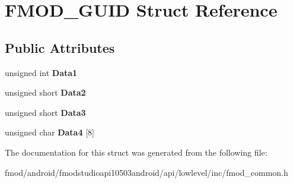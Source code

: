 \hypertarget{struct_f_m_o_d___g_u_i_d}{\section{F\+M\+O\+D\+\_\+\+G\+U\+I\+D Struct Reference}
\label{struct_f_m_o_d___g_u_i_d}
}
\subsection*{Public Attributes}
\begin{DoxyCompactItemize}
\item 
\hypertarget{struct_f_m_o_d___g_u_i_d_ade5cc5a3c9665147a488c8a9e2ea211c}{unsigned int {\bfseries Data1}}\label{struct_f_m_o_d___g_u_i_d_ade5cc5a3c9665147a488c8a9e2ea211c}

\item 
\hypertarget{struct_f_m_o_d___g_u_i_d_ac5805cdbaf5cfa2113d637e11f6ad36e}{unsigned short {\bfseries Data2}}\label{struct_f_m_o_d___g_u_i_d_ac5805cdbaf5cfa2113d637e11f6ad36e}

\item 
\hypertarget{struct_f_m_o_d___g_u_i_d_a98f6f2f06cad235236cbc86099aa4e96}{unsigned short {\bfseries Data3}}\label{struct_f_m_o_d___g_u_i_d_a98f6f2f06cad235236cbc86099aa4e96}

\item 
\hypertarget{struct_f_m_o_d___g_u_i_d_aa909de92a1f7dd124c295ab966045c26}{unsigned char {\bfseries Data4} \mbox{[}8\mbox{]}}\label{struct_f_m_o_d___g_u_i_d_aa909de92a1f7dd124c295ab966045c26}

\end{DoxyCompactItemize}


The documentation for this struct was generated from the following file\+:\begin{DoxyCompactItemize}
\item 
fmod/android/fmodstudioapi10503android/api/lowlevel/inc/fmod\+\_\+common.\+h\end{DoxyCompactItemize}

